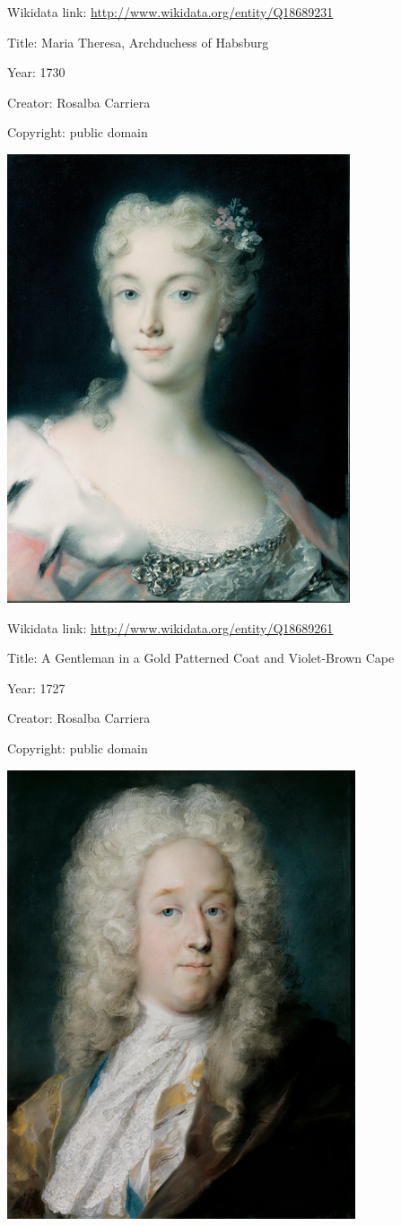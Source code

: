 \documentclass[
  letterpaper,
]{book}
\begin{document}
Wikidata link: \url{http://www.wikidata.org/entity/Q18689231}

Title: Maria Theresa, Archduchess of Habsburg

Year: 1730

Creator: Rosalba Carriera

Copyright: public domain

\includegraphics{paintings_files/figure-pdf/cell-2-output-2.png}

Wikidata link: \url{http://www.wikidata.org/entity/Q18689261}

Title: A Gentleman in a Gold Patterned Coat and Violet-Brown Cape

Year: 1727

Creator: Rosalba Carriera

Copyright: public domain

\includegraphics{paintings_files/figure-pdf/cell-2-output-4.png}
\end{document}
